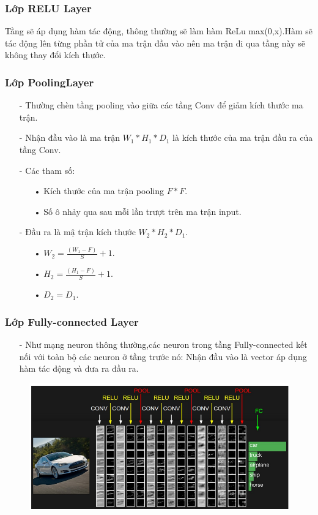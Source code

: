 \documentclass[a4paper,12pt]{report}
\begin{document}
\subsubsection{Lớp RELU Layer}
Tầng sẽ áp dụng hàm tác động, thông thường sẽ làm hàm ReLu max(0,x).Hàm sẽ tác động lên từng phần tử của ma trận đầu vào nên ma trận đi qua tầng này sẽ không thay đổi kích thước.
\subsubsection{Lớp PoolingLayer}
\begin{itemize}
\item[-] Thường chèn tầng pooling vào giữa các tầng Conv để giảm kích thước ma trận.
\item[-] Nhận đầu vào là ma trận $W_1*H_1*D_1$ là kích thước của ma trận đầu ra của tầng Conv.
\item[-] Các tham số:
\begin{itemize}
\item[•] Kích thước của ma trận pooling $F*F$.
\item[•] Số ô nhảy qua sau mỗi lần trượt trên ma trận input.
\end{itemize}
\item[-] Đầu ra là mậ trận kích thước $W_2*H_2*D_1$.
\begin{itemize}
\item[•] $W_2 = \frac{(W_1 - F)}{S} + 1$.
\item[•] $H_2 = \frac{(H_1 - F)}{S} + 1$.
\item[•] $D_2 = D_1$.
\end{itemize}
\end{itemize}
\subsubsection{Lớp Fully-connected Layer}
\begin{itemize}
\item[-] Như mạng neuron thông thường,các neuron trong tầng Fully-connected kết nối với toàn bộ các neuron ở tầng trước nó: Nhận đầu vào là vector áp dụng hàm tác động và đưa ra đầu ra.
\end{itemize}
\begin{figure}[h]
\begin{center}
\includegraphics[width =0.8 \textwidth]{ConvNetArchitecture.png}
\end{center}
\end{figure}
\end{document}
